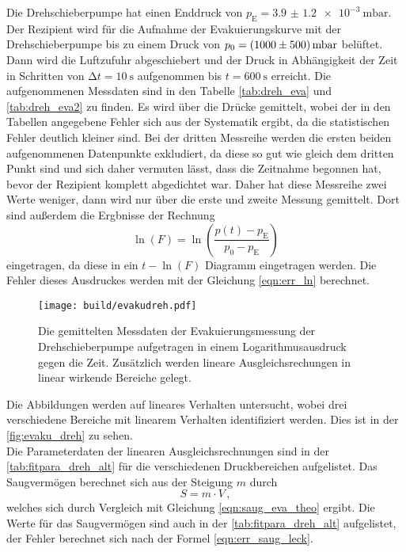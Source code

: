     \noindent Die Drehschieberpumpe hat einen Enddruck von $p_\text{E} = \SI{3.9(12)e-3}{\milli\bar}$. Der Rezipient wird für die Aufnahme der Evakuierungskurve mit der Drehschieberpumpe 
    bis zu einem Druck von $p_0 = \SI{1000 \pm 500}{\milli\bar}$ belüftet. Dann wird die Luftzufuhr abgeschiebert und der Druck in Abhängigkeit der Zeit in 
    Schritten von $\increment t = \SI{10}{\second}$ aufgenommen bis $t = \SI{600}{\second}$ erreicht. Die aufgenommenen Messdaten sind in den Tabelle \ref{tab:dreh_eva} und \ref{tab:dreh_eva2} zu finden. 
    Es wird über die Drücke gemittelt, wobei der in den Tabellen angegebene Fehler sich aus der Systematik ergibt, da die statistischen Fehler deutlich kleiner sind.
    Bei der dritten Messreihe werden die ersten beiden aufgenommenen Datenpunkte exkludiert, da diese so gut wie gleich dem dritten Punkt sind und sich 
    daher vermuten lässt, dass die Zeitnahme begonnen hat, bevor der Rezipient komplett abgedichtet war. Daher hat diese Messreihe zwei Werte weniger, dann wird nur über die 
    erste und zweite Messung gemittelt.
    Dort sind außerdem die Ergbnisse der Rechnung 
    \begin{equation*}
      \ln(F) = \ln \left( \frac{p(t) - p_\text{E}}{p_0 - p_\text{E}}\right)
    \end{equation*}
    eingetragen, da diese in ein $t - \ln(F)$ Diagramm eingetragen werden. Die Fehler dieses Ausdruckes werden mit der Gleichung \eqref{eqn:err_ln} berechnet.  

    \begin{figure}[H]
      \centering
      \texttt{[image: build/evakudreh.pdf]}
      \caption{Die gemittelten Messdaten der Evakuierungsmessung der Drehschieberpumpe aufgetragen in einem Logarithmusausdruck gegen die Zeit. Zusätzlich werden lineare Ausgleichsrechungen in linear wirkende Bereiche gelegt.}
      \label{fig:evaku_dreh}
    \end{figure}

    \noindent Die Abbildungen werden auf lineares Verhalten untersucht, wobei drei verschiedene Bereiche mit linearem Verhalten identifiziert werden. 
    Dies ist in der \autoref{fig:evaku_dreh} zu sehen.  \\ 
    Die Parameterdaten der linearen Ausgleichsrechnungen sind in der \autoref{tab:fitpara_dreh_alt} für die verschiedenen Druckbereichen aufgelistet. Das Saugvermögen berechnet sich 
    aus der Steigung $m$ durch 
    \begin{equation*}
      S = m \cdot V\, ,
    \end{equation*}
    welches sich durch Vergleich mit Gleichung \eqref{eqn:saug_eva_theo} ergibt.
    Die Werte für das Saugvermögen sind auch in der \autoref{tab:fitpara_dreh_alt} aufgelistet, der Fehler berechnet sich nach der Formel \eqref{eqn:err_saug_leck}. 

